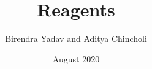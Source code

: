 \documentclass[12pt]{article}
\title{Reagents}
\author{Birendra Yadav and Aditya Chincholi}
\date{August 2020}
\begin{document}
\sloppy
\renewcommand{\familydefault}{\sfdefault}

\maketitle
\pagebreak
\tableofcontents
\pagebreak

\end{document}
